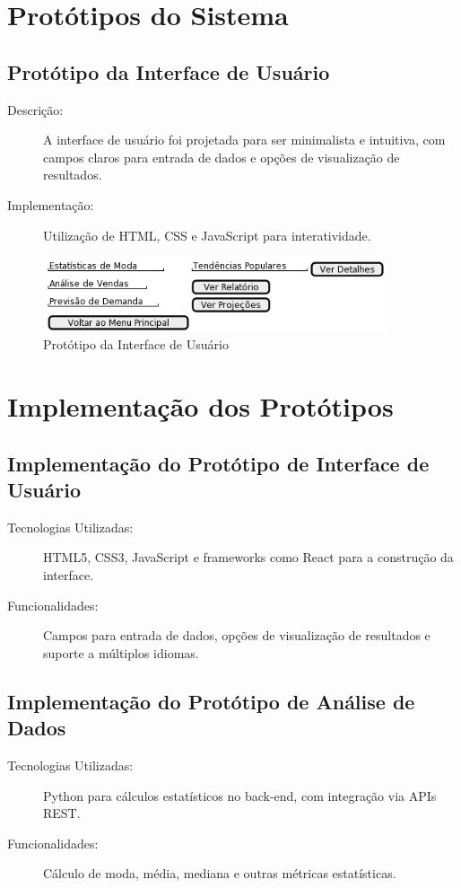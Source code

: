 \documentclass[12pt,a4paper]{article}
\begin{document}
\newpage
\section{Protótipos do Sistema}

\subsection{Protótipo da Interface de Usuário}
\begin{description}
    \item[Descrição:] A interface de usuário foi projetada para ser minimalista e intuitiva, com campos claros para entrada de dados e opções de visualização de resultados.
    \item[Implementação:] Utilização de HTML, CSS e JavaScript para interatividade.
\end{description}

\begin{figure}[h]
    \centering
    \includegraphics[width=0.9\textwidth]{imagens/prototipo-de-interface-usuario.png}
    \caption{Protótipo da Interface de Usuário}
\end{figure}

\section{Implementação dos Protótipos}

\subsection{Implementação do Protótipo de Interface de Usuário}
\begin{description}
    \item[Tecnologias Utilizadas:] HTML5, CSS3, JavaScript e frameworks como React para a construção da interface.
    \item[Funcionalidades:] Campos para entrada de dados, opções de visualização de resultados e suporte a múltiplos idiomas.
\end{description}

\subsection{Implementação do Protótipo de Análise de Dados}
\begin{description}
    \item[Tecnologias Utilizadas:] Python para cálculos estatísticos no back-end, com integração via APIs REST.
    \item[Funcionalidades:] Cálculo de moda, média, mediana e outras métricas estatísticas.
\end{description}
\end{document}
